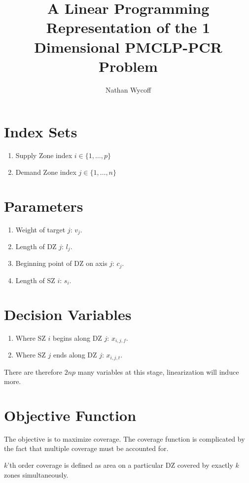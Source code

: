 \documentclass[a4paper]{article}
\title{A Linear Programming Representation of the 1 Dimensional PMCLP-PCR Problem}
\author{Nathan Wycoff}
\begin{document}
\maketitle

\section{Index Sets}

\begin{enumerate}
    \item Supply Zone index $i \in \{1, \ldots, p\}$
    \item Demand Zone index $j \in \{1, \ldots, n\}$
\end{enumerate}

\section{Parameters}

\begin{enumerate}
    \item Weight of target $j$: $v_j$.
    \item Length of DZ $j$: $l_j$.
    \item Beginning point of DZ on axis $j$: $c_{j}$.
    \item Length of SZ $i$: $s_i$.
\end{enumerate}

\section{Decision Variables}

\begin{enumerate}
    \item Where SZ $i$ begins along DZ $j$: $x_{i,j,f}$.
    \item Where SZ $j$ ends along DZ $j$: $x_{i,j,t}$.
\end{enumerate}

There are therefore $2np$ many variables at this stage, linearization will induce more.

\section{Objective Function}

The objective is to maximize coverage. The coverage function is complicated by the fact that multiple coverage must be accounted for. 

$k$'th order coverage is defined as area on a particular DZ covered by exactly $k$ zones simultaneously. 
\end{document}
